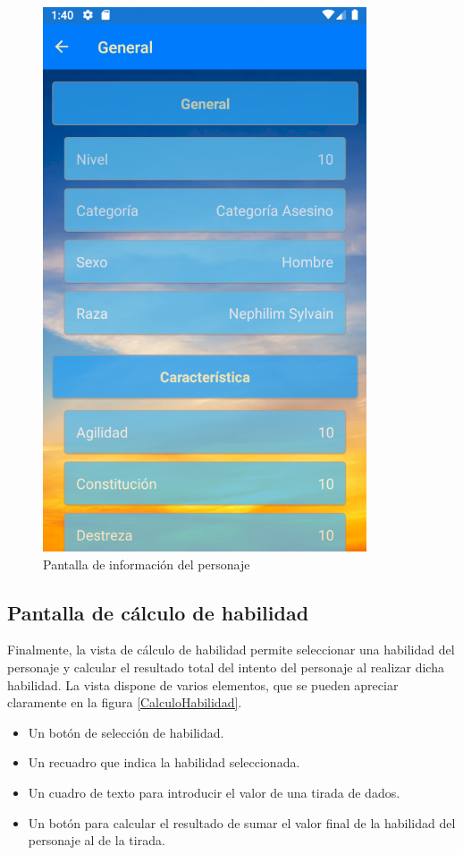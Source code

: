 \begin{figure}[H]
    \centering
    \includegraphics[scale=0.7]{Figures/Capturas/InformacionPersonaje.png}
    \caption{Pantalla de información del personaje}
    \label{InfoPersonaje}    
\end{figure}

\subsection{Pantalla de cálculo de habilidad}
Finalmente, la vista de cálculo de habilidad permite seleccionar una habilidad del personaje y 
calcular el resultado total del intento del personaje al realizar dicha habilidad. La vista dispone de varios elementos, 
que se pueden apreciar claramente en la figura \ref*{CalculoHabilidad}.
\begin{itemize}
    \item Un botón de selección de habilidad.
    \item Un recuadro que indica la habilidad seleccionada.
    \item Un cuadro de texto para introducir el valor de una tirada de dados.
    \item Un botón para calcular el resultado de sumar el valor final de la habilidad del personaje al de la tirada.
\end{itemize}

